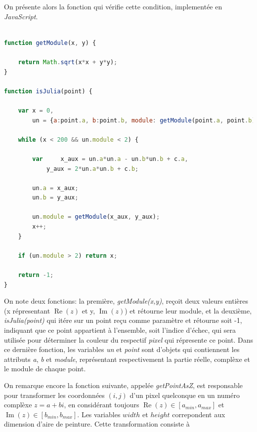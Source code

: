 \documentclass{article}
\theoremstyle{definition}
\begin{document}
\vspace{12pt}

On présente alors la fonction qui vérifie cette condition, implementée en
\textit{JavaScript}.

\newpage

\begin{lstlisting}[language=JavaScript]

function getModule(x, y) {
	
	return Math.sqrt(x*x + y*y);
}

function isJulia(point) {

	var x = 0,
	    un = {a:point.a, b:point.b, module: getModule(point.a, point.b)};
	
	while (x < 200 && un.module < 2) {
		
		var 	x_aux = un.a*un.a - un.b*un.b + c.a,
			y_aux = 2*un.a*un.b + c.b;
			  
		un.a = x_aux;
		un.b = y_aux;
	
		un.module = getModule(x_aux, y_aux);
		x++;
	}

	if (un.module > 2) return x;
	
	return -1;
}
\end{lstlisting}

\vspace{12pt}

On note deux fonctions: la première, \textit{getModule(x,y)}, reçoit deux
valeurs entières (x répresentant \(\operatorname{Re}(z)\) et y,
\(\operatorname{Im}(z)\)) et rétourne leur module, et la deuxième, 
\textit{isJulia(point)} qui itére sur un point reçu comme paramètre et rétourne
soit -1, indiquant que ce point appartient à l'ensemble, soit l'indice d'échec,
qui sera utilisée pour déterminer la couleur du respectif \textit{pixel} qui
répresente ce point. Dans ce dernière fonction, les variables \textit{un} et
\textit{point} sont d'objets qui contiennent les attributs \textit{a},
\textit{b} et \textit{module}, représentant respectivement la partie
réelle, complèxe et le module de chaque point.

\vspace{12pt} 

On remarque encore la fonction suivante, appelée \textit{getPointAsZ}, est
responsable pour transformer les coordonnées \((i,j)\) d'un pixel quelconque en un numéro
complèxe \(z = a+bi\), en considérant toujours  \(\operatorname{Re}(z) \in
[a_{min}, a_{max}]\) et \(\operatorname{Im}(z) \in [b_{min},
b_{max}]\). Les variables \(width\) et \(height\) correpondent aux dimension
d'aire de peinture. Cette transformation consiste à  
\end{document}
